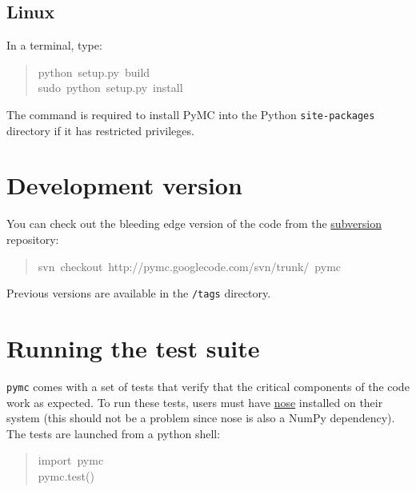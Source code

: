 \hypertarget{linux}{}
\subsection*{Linux}

In a terminal, type:
\begin{quote}{\ttfamily \raggedright \noindent
python~setup.py~build~\\
sudo~python~setup.py~install
}\end{quote}

The  command is required to install PyMC into the Python 
\texttt{site-packages} directory if it has restricted privileges.



\hypertarget{development-version}{}
\section*{Development version}

You can check out the bleeding edge version of the code from the \href{http://subversion.tigris.org/}{subversion} 
repository:
\begin{quote}{\ttfamily \raggedright \noindent
svn~checkout~http://pymc.googlecode.com/svn/trunk/~pymc
}\end{quote}

Previous versions are available in the \texttt{/tags} directory.



\hypertarget{running-the-test-suite}{}
\section*{Running the test suite}

\texttt{pymc} comes with a set of tests that verify that the critical components
of the code work as expected. To run these tests, users must have \href{http://somethingaboutorange.com/mrl/projects/nose/}{nose}
installed on their system (this should not be a problem since nose is also
a NumPy dependency). The tests are launched from a python shell:
\begin{quote}{\ttfamily \raggedright \noindent
import~pymc~\\
pymc.test()
}\end{quote}

